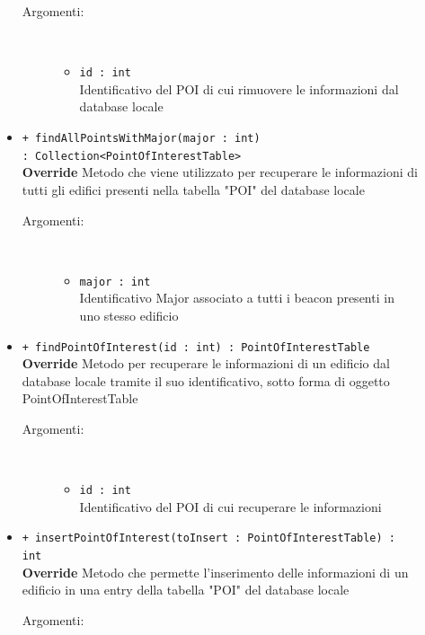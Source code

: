 \documentclass[../DefinizioneDiProdotto.tex]{subfiles}
\begin{document}
\begin{description}
\begin{itemize}
		\begin{description}
			\item[Argomenti:] \
			\begin{itemize}
				\item \texttt{id : int}\\
				Identificativo del POI di cui rimuovere le informazioni dal database locale\end{itemize}
		\end{description}
		\item \texttt{+ findAllPointsWithMajor(major : int) \\ : Collection<PointOfInterestTable>}\\
		\textbf{Override} Metodo che viene utilizzato per recuperare le informazioni di tutti gli edifici presenti nella tabella "POI" del database locale
		\begin{description}
			\item[Argomenti:] \
			\begin{itemize}
				\item \texttt{major : int}\\
				Identificativo Major associato a tutti i beacon presenti in uno stesso edificio\end{itemize}
		\end{description}
		\item \texttt{+ findPointOfInterest(id : int) : PointOfInterestTable}\\
		\textbf{Override} Metodo per recuperare le informazioni di un edificio dal database locale tramite il suo identificativo, sotto forma di oggetto PointOfInterestTable
		\begin{description}
			\item[Argomenti:] \
			\begin{itemize}
				\item \texttt{id : int}\\
				Identificativo del POI di cui recuperare le informazioni\end{itemize}
		\end{description}
		\item \texttt{+ insertPointOfInterest(toInsert : PointOfInterestTable) : int}\\
		\textbf{Override} Metodo che permette l'inserimento delle informazioni di un edificio in una entry della tabella "POI" del database locale
		\begin{description}
			\item[Argomenti:] \
			\begin{itemize}

\end{itemize}
\end{description}
\end{itemize}
\end{description}
\end{document}
